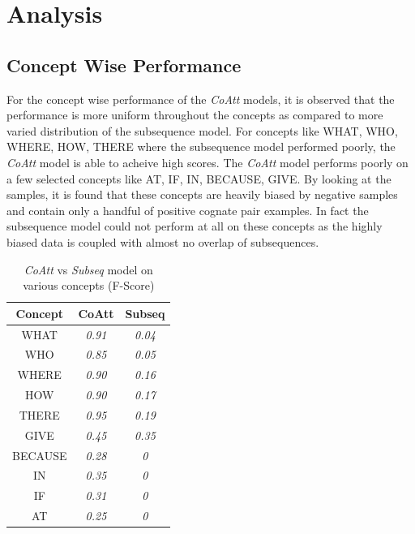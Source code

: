 \documentclass[11pt,letterpaper]{article}
\begin{document}
\section{Analysis}

\subsection{Concept Wise Performance}

For the concept wise performance of the \textit{CoAtt} models, it is observed that the performance is more uniform throughout the concepts as compared to more varied distribution of the subsequence model. For concepts like WHAT, WHO, WHERE, HOW, THERE where the subsequence model performed poorly, the \textit{CoAtt} model is able to acheive high scores. The \textit{CoAtt} model performs poorly on a few selected concepts like AT, IF, IN, BECAUSE, GIVE. By looking at the samples, it is found that these concepts are heavily biased by negative samples and contain only a handful of positive cognate pair examples. In fact the subsequence model could not perform at all on these concepts as the highly biased data is coupled with almost no overlap of subsequences.

\begin{table}[h]
\centering
\begin{tabular}{ccc}
\textbf{Concept} & \textbf{CoAtt} & \textbf{Subseq} \\ \hline
WHAT             & \textit{0.91}  & \textit{0.04}   \\
WHO              & \textit{0.85}  & \textit{0.05}   \\
WHERE            & \textit{0.90}  & \textit{0.16}   \\
HOW              & \textit{0.90}  & \textit{0.17}   \\
THERE            & \textit{0.95}  & \textit{0.19}  \\
GIVE             & \textit{0.45}  & \textit{0.35}  \\
BECAUSE          & \textit{0.28}  & \textit{0}      \\
IN               & \textit{0.35}  & \textit{0}      \\
IF               & \textit{0.31}  & \textit{0}      \\
AT               & \textit{0.25}  & \textit{0}      
\end{tabular}
\caption{\textit{CoAtt} vs \textit{Subseq} model on various concepts (F-Score)}
\end{table}
\end{document}
